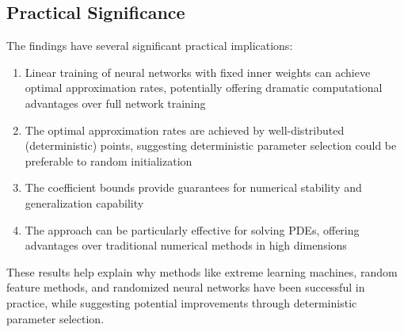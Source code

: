 \documentclass[11pt]{article}
\begin{document}
\subsection{Practical Significance}

The findings have several significant practical implications:

\begin{enumerate}
    \item Linear training of neural networks with fixed inner weights can achieve optimal approximation rates, potentially offering dramatic computational advantages over full network training
    
    \item The optimal approximation rates are achieved by well-distributed (deterministic) points, suggesting deterministic parameter selection could be preferable to random initialization
    
    \item The coefficient bounds provide guarantees for numerical stability and generalization capability
    
    \item The approach can be particularly effective for solving PDEs, offering advantages over traditional numerical methods in high dimensions
\end{enumerate}

These results help explain why methods like extreme learning machines, random feature methods, and randomized neural networks have been successful in practice, while suggesting potential improvements through deterministic parameter selection.
\end{document}
